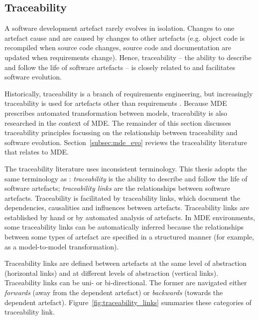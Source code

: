\subsection{Traceability}
\label{subsec:traceability}
A software development artefact rarely evolves in isolation. Changes to one artefact cause and are caused by changes to other artefacts (e.g. object code is recompiled when source code changes, source code and documentation are updated when requirements change). Hence, traceability -- the ability to describe and follow the life of software artefacts \cite{winkler09survey,lago09scoped} -- is closely related to and facilitates software evolution.

Historically, traceability is a branch of requirements engineering, but increasingly traceability is used for artefacts other than requirements \cite{winkler09survey}. Because MDE prescribes automated transformation between models, traceability is also researched in the context of MDE. The remainder of this section discusses traceability principles focussing on the relationship between traceability and software evolution. Section~\ref{subsec:mde_evo} reviews the traceability literature that relates to MDE.

The traceability literature uses inconsistent terminology. This thesis adopts the same terminology as \cite{winkler09survey}: \emph{traceability} is the ability to describe and follow the life of software artefacts; \emph{traceability links} are the relationships between software artefacts. Traceability is facilitated by traceability links, which document the dependencies, causalities and influences between artefacts. Traceability links are established by hand or by automated analysis of artefacts. In MDE environments, some traceability links can be automatically inferred because the relationships between some types of artefact are specified in a structured manner (for example, as a model-to-model transformation).

Traceability links are defined between artefacts at the same level of abstraction (horizontal links) and at different levels of abstraction (vertical links). Traceability links can be uni- or bi-directional. The former are navigated either \emph{forwards} (away from the dependent artefact) or \emph{backwards} (towards the dependent artefact). Figure~\ref{fig:traceability_links} summaries these categories of traceability link.

